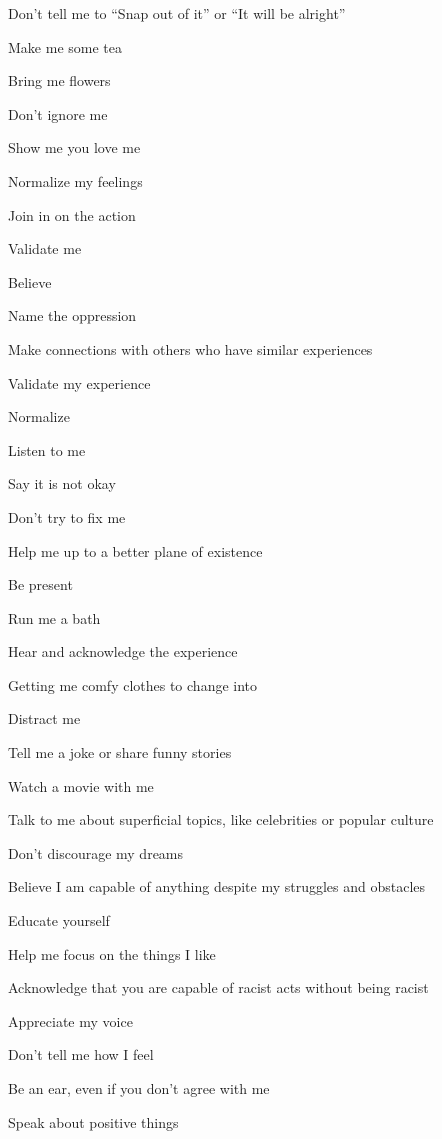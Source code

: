 \begin{multicols}{2}
\begin{checkboxlist}
\item Don’t tell me to “Snap out of it” or “It will be alright”
\item Make me some tea
\item Bring me flowers
\item Don’t ignore me
\item Show me you love me
\item Normalize my feelings
\item Join in on the action
\item Validate me
\item Believe
\item Name the oppression
\item Make connections with others who have similar experiences
\item Validate my experience
\item Normalize
\item Listen to me
\item Say it is not okay
\item Don’t try to fix me
\item Help me up to a better plane of existence
\item Be present
\item Run me a bath
\item Hear and acknowledge the experience
\item Getting me comfy clothes to change into
\item Distract me
\item Tell me a joke or share funny stories
\item Watch a movie with me
\item Talk to me about superficial topics, like celebrities or popular culture
\item Don’t discourage my dreams
\item Believe I am capable of anything despite my struggles and obstacles
\item Educate yourself
\item Help me focus on the things I like
\item Acknowledge that you are capable of racist acts without being racist
\item Appreciate my voice
\item Don’t tell me how I feel
\item Be an ear, even if you don’t agree with me
\item Speak about positive things

\end{checkboxlist}
\end{multicols}
